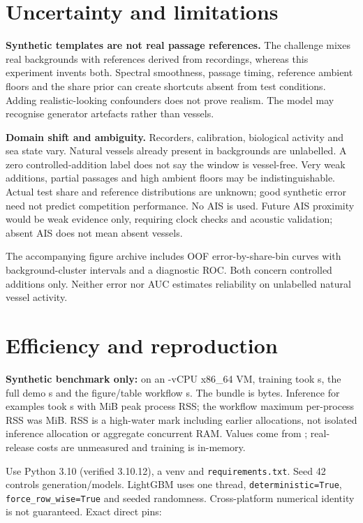 \documentclass[a4paper,11pt]{article}
\begin{document}
\section{Uncertainty and limitations}
\textbf{Synthetic templates are not real passage references.} The challenge
mixes real backgrounds with references derived from recordings, whereas this
experiment invents both. Spectral smoothness, passage timing, reference
ambient floors and the share prior can create shortcuts absent from test
conditions. Adding realistic-looking confounders does not prove realism.
The model may recognise generator artefacts rather than vessels.

\textbf{Domain shift and ambiguity.} Recorders, calibration, biological
activity and sea state vary. Natural vessels already present in backgrounds
are unlabelled. A zero controlled-addition label does not say the window is
vessel-free. Very weak additions, partial passages and high ambient floors
may be indistinguishable. Actual test share and reference distributions are
unknown; good synthetic error need not predict competition performance.
No AIS is used. Future AIS proximity would be weak evidence only, requiring
clock checks and acoustic validation; absent AIS does not mean absent vessels.

The accompanying figure archive includes OOF error-by-share-bin curves with
background-cluster intervals and a diagnostic ROC. Both concern controlled
additions only. Neither error nor AUC estimates reliability on unlabelled
natural vessel activity.

\newpage
\section{Efficiency and reproduction}
\textbf{Synthetic benchmark only:} on an \HardwareCPUs{}-vCPU x86\_64 VM,
training took \TrainSeconds{} s, the full demo \DemoSeconds{} s and the
figure/table workflow \FigureSeconds{} s. The bundle is \ModelBytes{} bytes.
Inference for \HeldoutCount{} examples took \InferenceSeconds{} s with
\InferenceMemory{} MiB peak process RSS; the workflow maximum per-process
RSS was \PeakMemory{} MiB. RSS is a high-water mark including earlier
allocations, not isolated inference allocation or aggregate concurrent RAM.
Values come from ; real-release costs
are unmeasured and training is in-memory.

Use Python 3.10 (verified 3.10.12), a venv and \texttt{requirements.txt}.
Seed 42 controls generation/models. LightGBM uses one thread,
\texttt{deterministic=True}, \texttt{force\_row\_wise=True} and seeded randomness.
Cross-platform numerical identity is not guaranteed. Exact direct pins:
{\footnotesize}
\end{document}
